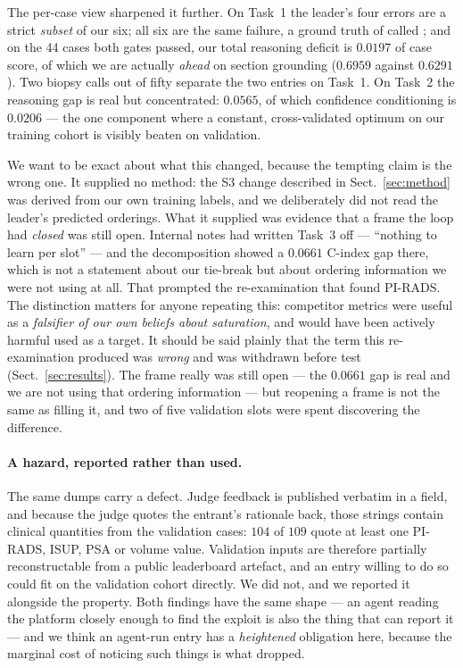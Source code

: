 The per-case view sharpened it further. On Task~1 the leader's four errors are a
strict \emph{subset} of our six; all six are the same failure, a ground truth of
 called ; and on the 44 cases both gates passed, our total
reasoning deficit is $0.0197$ of case score, of which we are actually \emph{ahead} on
section grounding ($0.6959$ against $0.6291$). Two biopsy calls out of fifty separate
the two entries on Task~1. On Task~2 the reasoning gap is real but concentrated:
$0.0565$, of which confidence conditioning is $0.0206$ --- the one component where a
constant, cross-validated optimum on our training cohort is visibly beaten on
validation.

We want to be exact about what this changed, because the tempting claim is the wrong
one. It supplied no method: the S3 change described in Sect.~\ref{sec:method} was
derived from our own training labels, and we deliberately did not read the leader's
predicted orderings. What it supplied was evidence that a frame the loop had
\emph{closed} was still open. Internal notes had written Task~3 off --- ``nothing to
learn per slot'' --- and the decomposition showed a $0.0661$ C-index gap there, which
is not a statement about our tie-break but about ordering information we were not
using at all. That prompted the re-examination that found PI-RADS. The distinction
matters for anyone repeating this: competitor metrics were useful as a
\emph{falsifier of our own beliefs about saturation}, and would have been actively
harmful used as a target. It should be said plainly that the term this re-examination
produced was \emph{wrong} and was withdrawn before test (Sect.~\ref{sec:results}). The
frame really was still open --- the $0.0661$ gap is real and we are not using that
ordering information --- but reopening a frame is not the same as filling it, and two
of five validation slots were spent discovering the difference.

\paragraph{A hazard, reported rather than used.}
The same dumps carry a defect. Judge feedback is published verbatim in a
 field, and because the judge quotes the entrant's rationale back, those
strings contain clinical quantities from the validation cases: $104$ of $109$ quote
at least one PI-RADS, ISUP, PSA or volume value. Validation inputs are therefore
partially reconstructable from a public leaderboard artefact, and an entry willing to
do so could fit on the validation cohort directly. We did not, and we reported it
alongside the  property. Both findings have the same
shape --- an agent reading the platform closely enough to find the exploit is also
the thing that can report it --- and we think an agent-run entry has a
\emph{heightened} obligation here, because the marginal cost of noticing such things
is what dropped.

